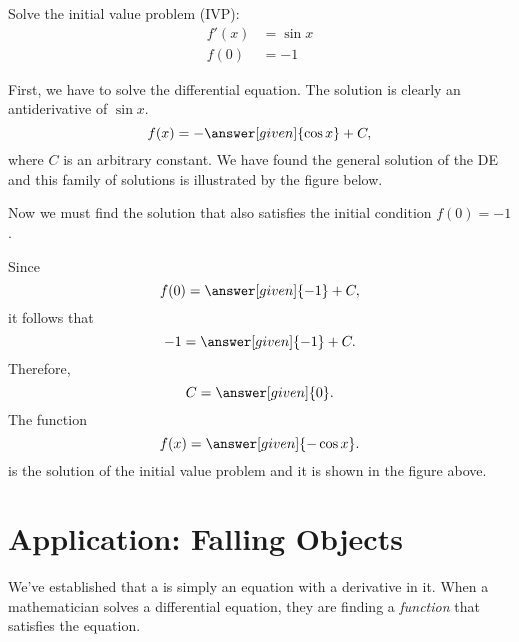 \documentclass{ximera}
\begin{document}
\begin{example}
	Solve the initial value problem (IVP):
	\begin{align*}
		f'(x) & = \sin{x}  \\
		f(0) & = -1 
	\end{align*}
	\begin{explanation}
		First, we have to solve the differential equation. The solution is clearly an antiderivative of $\sin{x}$.
		\[
		f(x)=-\answer[given]{\cos{x}}+C,
		\]
		where $C$ is an arbitrary constant. We have found the general solution of the DE  and this family of solutions is illustrated by the figure below. 
		\begin{image}
		\end{image}
		Now we must find the solution that also satisfies the initial condition 
		$f(0)=-1$.
		
		Since
		\[
		f(0)=\answer[given]{-1}+C,
		\]
		it follows that
		\[
		-1=\answer[given]{-1}+C.
		\]
		Therefore,
		\[
		C=\answer[given]{0}.
		\]
		The function 
		\[
		f(x)=\answer[given]{-\cos{x}}.
		\]
		is the solution of the initial value problem and it is shown in the figure above.
	\end{explanation}
\end{example}


\section{Application: Falling Objects}
We've established that a  is simply an equation with a derivative in it.
When a mathematician solves a differential equation, they are finding
a \textit{function} that satisfies the equation.
\end{document}
